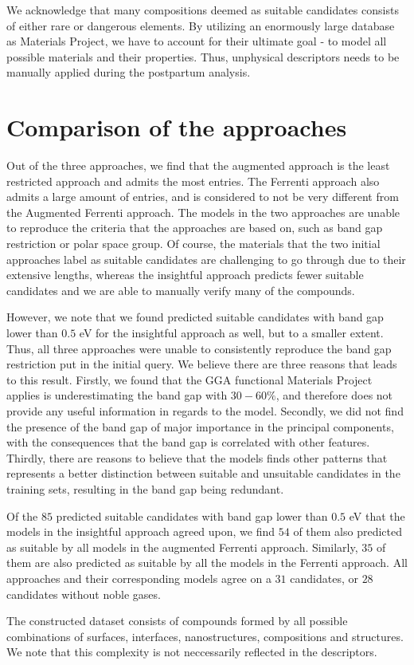 We acknowledge that many compositions deemed as suitable candidates consists of either rare or dangerous elements. By utilizing an enormously large database as Materials Project, we have to account for their ultimate goal - to model all possible materials and their properties. Thus, unphysical descriptors needs to be manually applied during the postpartum analysis.


\section{Comparison of the approaches}

Out of the three approaches, we find that the augmented approach is the least restricted approach and admits the most entries. The Ferrenti approach also admits a large amount of entries, and is considered to not be very different from the Augmented Ferrenti approach. The models in the two approaches are unable to reproduce the criteria that the approaches are based on, such as band gap restriction or polar space group. Of course, the materials that the two initial approaches label as suitable candidates are challenging to go through due to their extensive lengths, whereas the insightful approach predicts fewer suitable candidates and we are able to manually verify many of the compounds.

However, we note that we found predicted suitable candidates with band gap lower than $0.5$ eV for the insightful approach as well, but to a smaller extent. Thus, all three approaches were unable to consistently reproduce the band gap restriction put in the initial query. We believe there are three reasons that leads to this result. Firstly, we found that the GGA functional Materials Project applies is underestimating the band gap with $30-60\%$, and therefore does not provide any useful information in regards to the model. Secondly, we did not find the presence of the band gap of major importance in the principal components, with the consequences that the band gap is correlated with other features. Thirdly, there are reasons to believe that the models finds other patterns that represents a better distinction between suitable and unsuitable candidates in the training sets, resulting in the band gap being redundant.

Of the $85$ predicted suitable candidates with band gap lower than $0.5$ eV that the models in the insightful approach agreed upon, we find $54$ of them also predicted as suitable by all models in the augmented Ferrenti approach. Similarly, $35$ of them are also predicted as suitable by all the models in the Ferrenti approach. All approaches and their corresponding models agree on a $31$ candidates, or $28$ candidates without noble gases.

The constructed dataset consists of compounds formed by all possible combinations of surfaces, interfaces, nanostructures, compositions and structures. We note that this complexity is not neccessarily reflected in the descriptors.

